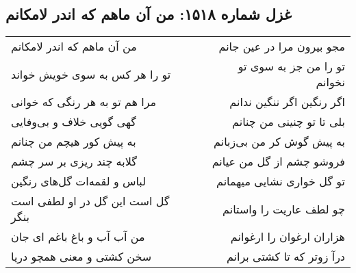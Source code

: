 \begin{center}
\section*{غزل شماره ۱۵۱۸: من آن ماهم که اندر لامکانم}
\label{sec:1518}
\begin{longtable}{l p{0.5cm} r}
من آن ماهم که اندر لامکانم
&&
مجو بیرون مرا در عین جانم
\\
تو را هر کس به سوی خویش خواند
&&
تو را من جز به سوی تو نخوانم
\\
مرا هم تو به هر رنگی که خوانی
&&
اگر رنگین اگر ننگین ندانم
\\
گهی گویی خلاف و بی‌وفایی
&&
بلی تا تو چنینی من چنانم
\\
به پیش کور هیچم من چنانم
&&
به پیش گوش کر من بی‌زبانم
\\
گلابه چند ریزی بر سر چشم
&&
فروشو چشم از گل من عیانم
\\
لباس و لقمه‌ات گل‌های رنگین
&&
تو گل خواری نشایی میهمانم
\\
گل است این گل در او لطفی است بنگر
&&
چو لطف عاریت را واستانم
\\
من آب آب و باغ باغم ای جان
&&
هزاران ارغوان را ارغوانم
\\
سخن کشتی و معنی همچو دریا
&&
درآ زوتر که تا کشتی برانم
\\
\end{longtable}
\end{center}
